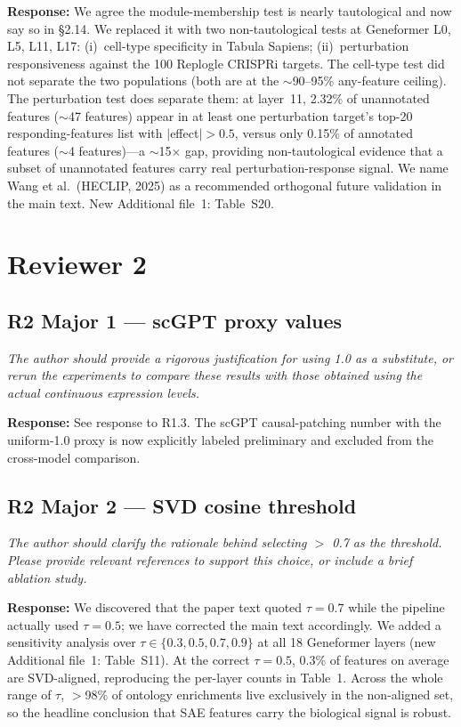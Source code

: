 \documentclass[11pt]{article}
\newcommand{\reviewercomment}[1]{\textit{\color{gray}#1}}
\newcommand{\response}[1]{\textbf{Response:} #1}
\begin{document}
\response{We agree the module-membership test is nearly tautological and now say so in \S2.14. We replaced it with two non-tautological tests at Geneformer L0, L5, L11, L17: (i)~cell-type specificity in Tabula Sapiens; (ii)~perturbation responsiveness against the 100 Replogle CRISPRi targets. The cell-type test did not separate the two populations (both are at the $\sim$90--95\% any-feature ceiling). The perturbation test does separate them: at layer~11, 2.32\% of unannotated features ($\sim$47 features) appear in at least one perturbation target's top-20 responding-features list with $|$effect$|>0.5$, versus only 0.15\% of annotated features ($\sim$4 features)---a $\sim$15$\times$ gap, providing non-tautological evidence that a subset of unannotated features carry real perturbation-response signal. We name Wang et al.\ (HECLIP, 2025) as a recommended orthogonal future validation in the main text. New Additional file~1: Table~S20.}

\bigskip

\section*{Reviewer 2}

\subsection*{R2 Major 1 --- scGPT proxy values}
\reviewercomment{The author should provide a rigorous justification for using 1.0 as a substitute, or rerun the experiments to compare these results with those obtained using the actual continuous expression levels.}

\response{See response to R1.3. The scGPT causal-patching number with the uniform-1.0 proxy is now explicitly labeled preliminary and excluded from the cross-model comparison.}

\subsection*{R2 Major 2 --- SVD cosine threshold}
\reviewercomment{The author should clarify the rationale behind selecting $>$ 0.7 as the threshold. Please provide relevant references to support this choice, or include a brief ablation study.}

\response{We discovered that the paper text quoted $\tau{=}0.7$ while the pipeline actually used $\tau{=}0.5$; we have corrected the main text accordingly. We added a sensitivity analysis over $\tau \in \{0.3, 0.5, 0.7, 0.9\}$ at all 18 Geneformer layers (new Additional file~1: Table~S11). At the correct $\tau{=}0.5$, 0.3\% of features on average are SVD-aligned, reproducing the per-layer counts in Table~1. Across the whole range of $\tau$, $>$98\% of ontology enrichments live exclusively in the non-aligned set, so the headline conclusion that SAE features carry the biological signal is robust.}
\end{document}
